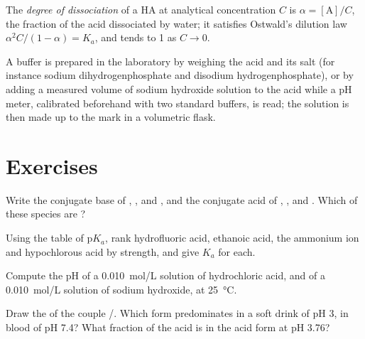 \begin{definition}\label{def:b1:predominant-reaction:dissociation}
The \emph{degree of dissociation} of a  HA at analytical concentration $C$ is $\alpha = [\mathrm{A}]/C$, the
fraction of the acid dissociated by water; it satisfies Ostwald's dilution
law $\alpha^2C/(1 - \alpha) = K_a$, and tends to 1 as $C \to 0$.
\end{definition}

\begin{inthelab}
A buffer is prepared in the laboratory by weighing the acid and its salt
(for instance sodium dihydrogenphosphate and disodium
hydrogenphosphate), or by adding a measured volume of sodium hydroxide
solution to the acid while a pH meter, calibrated beforehand with two
standard buffers, is read; the solution is then made up to the mark in a
volumetric flask.
\end{inthelab}

\section{Exercises}

\begin{exercise}[$\star$]\label{exo:b1:predominant-reaction:1}
Write the conjugate base of , ,  and
, and the conjugate acid of , ,  and
. Which of these species are ?
\end{exercise}

\begin{exercise}[$\star$]\label{exo:b1:predominant-reaction:2}
Using the table of $\mathrm{p}K_a$, rank hydrofluoric acid, ethanoic acid,
the ammonium ion and hypochlorous acid by strength, and give $K_a$ for
each.
\end{exercise}

\begin{exercise}[$\star$]\label{exo:b1:predominant-reaction:3}
Compute the pH of a \qty{0.010}{mol/L} solution of hydrochloric acid,
and of a \qty{0.010}{mol/L} solution of sodium hydroxide, at
\qty{25}{\celsius}.
\end{exercise}

\begin{exercise}[$\star$]\label{exo:b1:predominant-reaction:4}
Draw the  of the couple /.
Which form predominates in a soft drink of pH 3, in blood of pH 7.4? What
fraction of the acid is in the acid form at pH 3.76?
\end{exercise}

